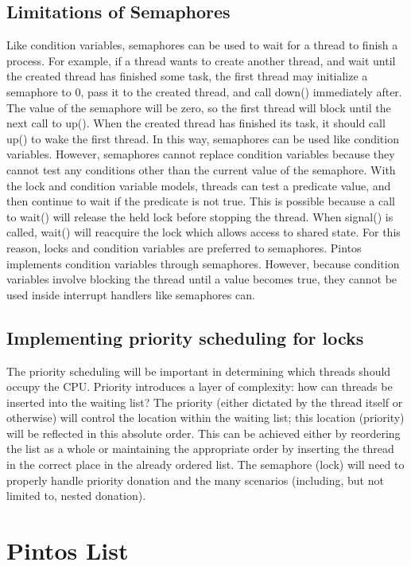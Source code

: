 \documentclass[11pt, letterpaper]{article}
\begin{document}
\subsection{Limitations of Semaphores}
Like condition variables, semaphores can be used to wait for a thread to finish a process. For example, if a thread wants to create another thread, and wait until the created thread has finished some task, the first thread may initialize a semaphore to 0, pass it to the created thread, and call down() immediately after. The value of the semaphore will be zero, so the first thread will block until the next call to up(). When the created thread has finished its task, it should call up() to wake the first thread.
In this way, semaphores can be used like condition variables. However, semaphores cannot replace condition variables because they cannot test any conditions other than the current value of the semaphore. With the lock and condition variable models, threads can test a predicate value, and then continue to wait if the predicate is not true. This is possible because a call to wait() will release the held lock before stopping the thread. When signal() is called, wait() will reacquire the lock which allows access to shared state. For this reason, locks and condition variables are preferred to semaphores. 
Pintos implements condition variables through semaphores. However, because condition variables involve blocking the thread until a value becomes true, they cannot be used inside interrupt handlers like semaphores can. 

\subsection{Implementing priority scheduling for locks}
The priority scheduling will be important in determining which threads should occupy the CPU. Priority introduces a layer of complexity: how can threads be inserted into the waiting list?  The priority (either dictated by the thread itself or otherwise) will control the location within the waiting list; this location (priority) will be reflected in this absolute order. This can be achieved either by reordering the list as a whole or maintaining the appropriate order by inserting the thread in the correct place in the already ordered list. The semaphore (lock) will need to properly handle priority donation and the many scenarios (including, but not limited to, nested donation). 


\section{Pintos List}
\end{document}
